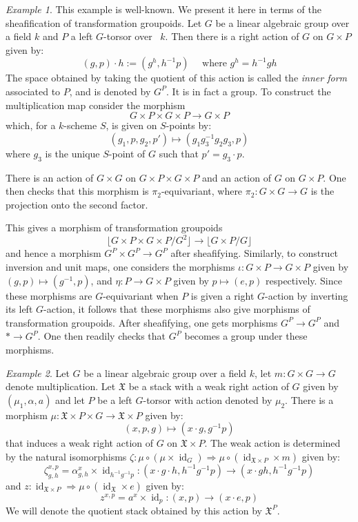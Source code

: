 \documentclass[12pt, final]{amsart}
\theoremstyle{remark}
\newtheorem{example}{Example}[section]
\theoremstyle{definition}
\theoremstyle{plain}
\newcommand{\trans}[1]{{\lfloor #1 \rfloor}}
\newcommand{\fX}{{\mathfrak X}}
\DeclareMathOperator{\id}{id}
\begin{document}
\begin{example}\label{e:inner} This example is well-known. We present it here in terms of the sheafification of transformation groupoids. 
    Let $G$ be a linear algebraic group over a field $k$ and $P$ a left $G$-torsor over ~$k$. 
    Then there is a right action of $G$ on $G \times P$ given by:
    $$
    (g,p) \cdot h := (g^h,h^{-1}p) \quad \text{ where } g^{h}=h^{-1}gh 
    $$
    The space obtained by taking the quotient of this action is called the \emph{inner form}
    associated to $P$, and is denoted by $G^{P}$. It is in fact a group. To construct the 
    multiplication map consider the morphism 
    $$
    G\times P \times G\times P \to G\times P
    $$
    which, for a $k$-scheme $S$, is given on $S$-points by:
    $$
    (g_{1},p,g_{2}, p') \mapsto (g_{1} g_{3}^{-1}g_{2}g_3,p)
    $$ where $g_3$ is the unique $S$-point of $G$ such that $p' = g_3\cdot p$. 

    There is an action of $G \times G$ on $G\times P\times G\times P$ and an action of 
    $G$ on $G\times P$. One then checks that this morphism is $\pi_{2}$-equivariant, where 
    $\pi_2:G\times G\to G$ is the projection onto the second factor. 

    This gives a morphism of transformation groupoids 
    $$
    \trans{G\times P\times G \times P/G^2}\to \trans{G\times P/G}
    $$
    and hence a morphism $G^{P}\times G^{P}\to G^{P}$ after sheafifying. 
    Similarly, to construct inversion and unit maps, one considers the morphisms 
    $\iota:G \times P \to G \times P$ given by $(g,p) \mapsto (g^{-1},p)$, and 
    $\eta:P \to G \times P$ given by $p \mapsto (e,p)$ respectively. Since these
    morphisms are $G$-equivariant when $P$ is given a right $G$-action by 
    inverting its left $G$-action, it follows that these morphisms also give 
    morphisms of transformation groupoids. After sheafifying, one gets 
    morphisms $G^P \to G^P$ and $* \to G^P$. One then readily checks that 
    $G^{P}$ becomes a group under these morphisms.
\end{example}

\begin{example}\label{e:twist}
    Let $G$ be a linear algebraic group over a field $k$, let $m:G \times G \to G$
    denote multiplication. Let $\fX$  be a stack with a weak right action of $G$ given by 
    $(\mu_1,\alpha, a)$ and let $P$ be a left $G$-torsor with action denoted 
    by $\mu_2$. There is a morphism $\mu:\fX \times P \times G \to \fX \times P$
    given by:
    $$ (x,p,g) \mapsto (x\cdot g,g^{-1}p) $$
    that induces a weak right action of $G$ on $\fX \times P$. The weak action is 
    determined by the natural isomorphisms 
    $\zeta:\mu \circ (\mu \times \id_G) \Rightarrow \mu \circ (\id_{\fX\times P} \times m)$
    given by:
    $$\zeta_{g,h}^{x,p} = \alpha_{g,h}^x \times \id_{h^{-1}g^{-1}p}: (x\cdot g\cdot h, h^{-1}g^{-1}p) \to (x\cdot gh, h^{-1}g^{-1}p)$$
    and $z:\id_{\fX\times P} \Rightarrow \mu\circ(\id_{\fX}\times e)$ 
    given by:
    $$z^{x,p} = a^x \times \id_{p}: (x,p) \to (x \cdot e, p) $$
    We will denote the quotient stack obtained by this action by $\fX^{P}$. 
\end{example}
\end{document}

